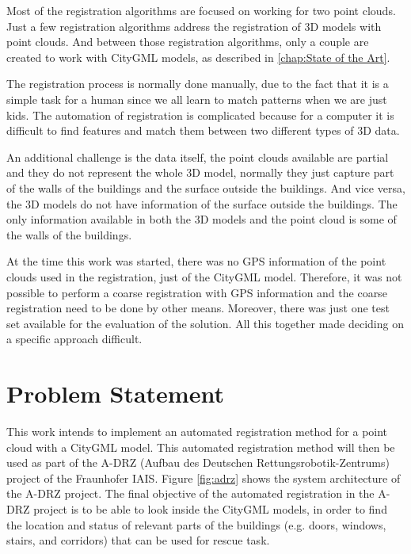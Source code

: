         Most of the registration algorithms are focused on working for two point clouds.
        Just a few registration algorithms address the registration of 3D models with point clouds.
        And between those registration algorithms, only a couple are created to work with CityGML models, as described in \autoref{chap:State of the Art}.
        \par      
        The registration process is normally done manually, due to the fact that it is a simple task for a human since we all learn to match patterns when we are just kids. 
        The automation of registration is complicated because for a computer it is difficult to find features and match them between two different types of 3D data.
        \par
        An additional challenge is the data itself, the point clouds available are partial and they do not represent the whole 3D model, 
        normally they just capture part of the walls of the buildings and the surface outside the buildings.
        And vice versa, the 3D models do not have information of the surface outside the buildings.
        The only information available in both the 3D models and the point cloud is some of the walls of the buildings.
        \par
        At the time this work was started, there was no GPS information of the point clouds used in the registration, just of the CityGML model. 
        Therefore, it was not possible to perform a coarse registration with GPS information and the coarse registration need to be done by other means.
        Moreover, there was just one test set available for the evaluation of the solution.
        All this together made deciding on a specific approach difficult.
        \par

    \section{Problem Statement}
        This work intends to implement an automated registration method for a point cloud with a CityGML model.
        This automated registration method will then be used as part of the A-DRZ (Aufbau des Deutschen Rettungsrobotik-Zentrums) \cite{A-DRZ_online} project of the Fraunhofer IAIS.
        Figure \ref{fig:adrz} shows the system architecture of the A-DRZ project. 
        The final objective of the automated registration in the A-DRZ project is to be able to look inside the CityGML models, in order to 
        find the location and status of relevant parts of the buildings (e.g. doors, windows, stairs, and corridors) that can be used for rescue task.

